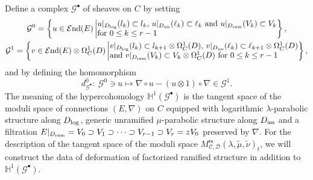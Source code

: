 \documentclass[pdftex]{sigma}
\numberwithin{equation}{section}
\newcommand{\balpha}{\boldsymbol \alpha}
\begin{document}
Define a complex ${\mathcal G}^{\bullet}$ of sheaves on $C$ by
setting
\begin{gather} \label{equation: definition of G^0,G^1}
 {\mathcal G}^0
=
 \left\{ u\in {\mathcal E}{\rm nd}(E) \, \middle|
 \begin{array}{@{}l@{}}
 \text{$u|_{D_{\mathrm{log}}}(l_k)\subset l_k$,
 $u|_{D_{\mathrm{un}}}(\ell_k)\subset \ell_k$ and $u|_{D_{\mathrm{ram}}}(V_k)\subset V_k$} \\
 \text{for $0\leq k \leq r-1$}
 \end{array}
 \right\}, \\
 {\mathcal G}^1
 =
 \left\{v\in{\mathcal E}{\rm nd}(E)\otimes\Omega^1_C(D) \,\middle|
 \begin{array}{@{}l@{}}
 \text{$v|_{D_{\mathrm{log}}}(l_k)\subset l_{k+1}\otimes\Omega^1_C(D)$,
 $v|_{D_{\mathrm{un}}}(\ell_k)\subset \ell_{k+1}\otimes\Omega^1_C(D)$} \\
 \text{and $v|_{D_{\mathrm{ram}}}(V_k)\subset V_k\otimes\Omega^1_C(D)$ for $0\leq k\leq r-1$}
 \end{array}
 \right\},\nonumber
\end{gather}
and by defining the homomorphism
\begin{equation} \label{equation: homomorphism of complex G}
 d^0_{\mathcal G^{\bullet}}\colon \
 {\mathcal G}^0 \ni u \mapsto \nabla \circ u-(u\otimes 1)\circ \nabla
 \in {\mathcal G}^1.
\end{equation}
The meaning of the hypercohomology
$\mathbb{H}^1({\mathcal G}^{\bullet})$ is the tangent space of
the moduli space of connections
$(E,\nabla)$ on $C$ equipped with logarithmic $\lambda$-parabolic structure along $D_{\rm log}$,
generic unramified $\mu$-parabolic structure along $D_{\rm un}$
and a filtration $E|_{D_{\rm ram}}=V_0\supset V_1\supset\cdots\supset V_{r-1}\supset V_r=zV_0$
preserved by $\nabla$.
For the description of the tangent space of the moduli space
$M^{\balpha}_{{\mathcal C},{\mathcal D}}(\lambda,\tilde{\mu},\tilde{\nu})_t$,
we will construct the data of deformation of factorized ramified structure
in addition to $\mathbb{H}^1({\mathcal G}^{\bullet})$.
\end{document}
